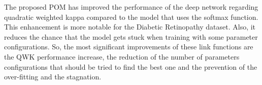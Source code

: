 \documentclass[journal]{IEEEtran}
\begin{document}
	The proposed POM has improved the performance of the deep network regarding quadratic weighted kappa compared to the model that uses the softmax function. This enhancement is more notable for the Diabetic Retinopathy dataset. Also, it reduces the chance that the model gets stuck when training with some parameter configurations. So, the most significant improvements of these link functions are the QWK performance increase, the reduction of the number of parameters configurations that should be tried to find the best one and the prevention of the over-fitting and the stagnation.
	
	
	
	
	

	
	
	\ifCLASSOPTIONcaptionsoff
	\newpage
	\fi
	
	
	
	
\end{document}
